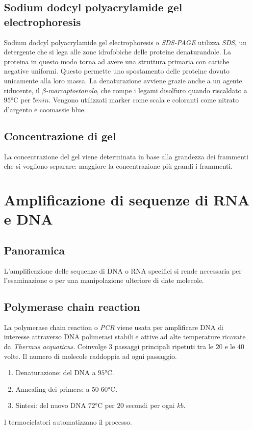 	\subsection{Sodium dodcyl polyacrylamide gel electrophoresis}
	Sodium dodcyl polyacrylamide gel electrophoresis o \emph{SDS-PAGE} utilizza \emph{SDS}, un detergente che si lega alle zone idrofobiche delle proteine denaturandole.
	La proteina in questo modo torna ad avere una struttura primaria con cariche negative uniformi.
	Questo permette uno spostamento delle proteine dovuto unicamente alla loro massa.
	La denaturazione avviene grazie anche a un agente riducente, il \emph{$\beta$-marcaptoetanolo}, che rompe i legami disolfuro quando riscaldato a $95\si{\celsius}$ per $5min$.
	Vengono utilizzati marker come scala e coloranti come nitrato d'argento e coomassie blue.

	\subsection{Concentrazione di gel}
	La concentrazione del gel viene determinata in base alla grandezza dei frammenti che si vogliono separare: maggiore la concentrazione pi\`u grandi i frammenti.

\section{Amplificazione di sequenze di RNA e DNA}

	\subsection{Panoramica}
	L'amplificazione delle sequenze di DNA o RNA specifici si rende necessaria per l'esaminazione o per una manipolazione ulteriore di date molecole.

	\subsection{Polymerase chain reaction}
	La polymerase chain reaction o \emph{PCR} viene usata per amplificare DNA di interesse attraverso DNA polimerasi stabili e attive ad alte temperature ricavate da \emph{Thermus acquaticus}.
	Coinvolge $3$ passaggi principali ripetuti tra le $20$ e le $40$ volte.
	Il numero di molecole raddoppia ad ogni passaggio.
	\begin{multicols}{2}
		\begin{enumerate}
			\item Denaturazione: del DNA a $95\si{\celsius}$.
			\item Annealing dei primers: a $50$-$60\si{\celsius}$.
			\item Sintesi: del nuovo DNA $72\si{\celsius}$ per $20$ secondi per ogni $kb$.
		\end{enumerate}
	\end{multicols}
	I termociclatori automatizzano il processo.

